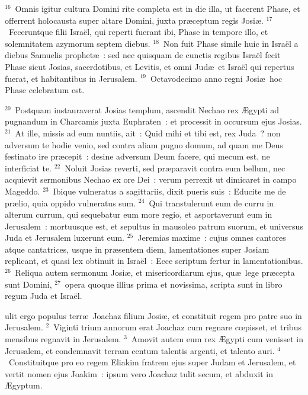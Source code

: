 ${}^{16}$~Omnis igitur cultura Domini rite completa est in die illa, ut facerent Phase, et offerrent holocausta super altare Domini, juxta pr\ae ceptum regis Josi\ae .
${}^{17}$~Feceruntque filii Isra\"el, qui reperti fuerant ibi, Phase in tempore illo, et solemnitatem azymorum septem diebus.
${}^{18}$~Non fuit Phase simile huic in Isra\"el a diebus Samuelis prophet\ae~: sed nec quisquam de cunctis regibus Isra\"el fecit Phase sicut Josias, sacerdotibus, et Levitis, et omni Jud\ae\ et Isra\"el qui repertus fuerat, et habitantibus in Jerusalem.
${}^{19}$~Octavodecimo anno regni Josi\ae\ hoc Phase celebratum est.


${}^{20}$~Postquam instauraverat Josias templum, ascendit Nechao rex \AE gypti ad pugnandum in Charcamis juxta Euphraten~: et processit in occursum ejus Josias.
${}^{21}$~At ille, missis ad eum nuntiis, ait~: Quid mihi et tibi est, rex Juda~? non adversum te hodie venio, sed contra aliam pugno domum, ad quam me Deus festinato ire pr\ae cepit~: desine adversum Deum facere, qui mecum est, ne interficiat te.
${}^{22}$~Noluit Josias reverti, sed pr\ae paravit contra eum bellum, nec acquievit sermonibus Nechao ex ore Dei~: verum perrexit ut dimicaret in campo Mageddo.
${}^{23}$~Ibique vulneratus a sagittariis, dixit pueris suis~: Educite me de pr\ae lio, quia oppido vulneratus sum.
${}^{24}$~Qui transtulerunt eum de curru in alterum currum, qui sequebatur eum more regio, et asportaverunt eum in Jerusalem~: mortuusque est, et sepultus in mausoleo patrum suorum, et universus Juda et Jerusalem luxerunt eum.
${}^{25}$~Jeremias maxime~: cujus omnes cantores atque cantatrices, usque in pr\ae sentem diem, lamentationes super Josiam replicant, et quasi lex obtinuit in Isra\"el~: Ecce scriptum fertur in lamentationibus.
${}^{26}$~Reliqua autem sermonum Josi\ae , et misericordiarum ejus, qu\ae\ lege pr\ae cepta sunt Domini,
${}^{27}$~opera quoque illius prima et novissima, scripta sunt in libro regum Juda et Isra\"el.

\bchapter
{}ulit ergo populus terr\ae\ Joachaz filium Josi\ae , et constituit regem pro patre suo in Jerusalem.
${}^{2}$~Viginti trium annorum erat Joachaz cum regnare cœpisset, et tribus mensibus regnavit in Jerusalem.
${}^{3}$~Amovit autem eum rex \AE gypti cum venisset in Jerusalem, et condemnavit terram centum talentis argenti, et talento auri.
${}^{4}$~Constituitque pro eo regem Eliakim fratrem ejus super Judam et Jerusalem, et vertit nomen ejus Joakim~: ipsum vero Joachaz tulit secum, et abduxit in \AE gyptum.


